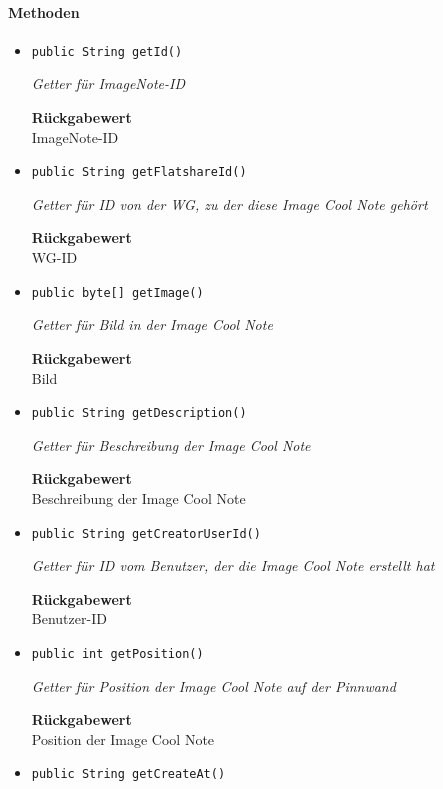      \paragraph*{Methoden}
     \begin{itemize}
     	\item{\texttt{public String getId()}}
     	
     	\textit{Getter für ImageNote-ID}
     	
     	
     	
     	\textbf{Rückgabewert} \\
     	ImageNote-ID        \item{\texttt{public String getFlatshareId()}}
     	
     	\textit{Getter für ID von der WG, zu der diese Image Cool Note gehört}
     	
     	
     	
     	\textbf{Rückgabewert} \\
     	WG-ID        \item{\texttt{public byte[] getImage()}}
     	
     	\textit{Getter für Bild in der Image Cool Note}
     	
     	
     	
     	\textbf{Rückgabewert} \\
     	Bild        \item{\texttt{public String getDescription()}}
     	
     	\textit{Getter für Beschreibung der Image Cool Note}
     	
     	
     	
     	\textbf{Rückgabewert} \\
     	Beschreibung der Image Cool Note        \item{\texttt{public String getCreatorUserId()}}
     	
     	\textit{Getter für ID vom Benutzer, der die Image Cool Note erstellt hat}
     	
     	
     	
     	\textbf{Rückgabewert} \\
     	Benutzer-ID        \item{\texttt{public int getPosition()}}
     	
     	\textit{Getter für Position der Image Cool Note auf der Pinnwand}
     	
     	
     	
     	\textbf{Rückgabewert} \\
     	Position der Image Cool Note        \item{\texttt{public String getCreateAt()}}
     	

\end{itemize}
